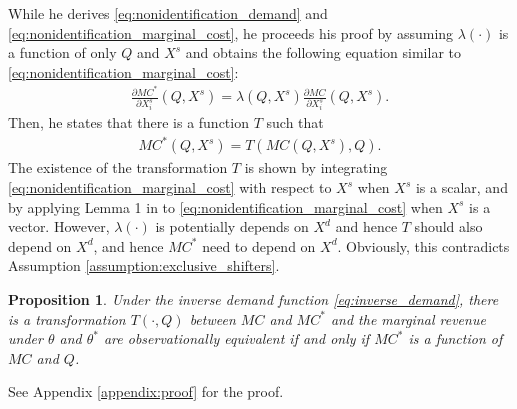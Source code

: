 \documentclass[11pt, a4paper]{article}
\newtheorem{proposition}{Proposition}
\theoremstyle{remark}
\begin{document}
While he derives \eqref{eq:nonidentification_demand} and \eqref{eq:nonidentification_marginal_cost}, he proceeds his proof by assuming $\lambda(\cdot)$ is a function of only $Q$ and $X^{s}$ and obtains the following equation similar to \eqref{eq:nonidentification_marginal_cost}:
\begin{align}
    \frac{\partial MC^{*}}{\partial X^{s}_i}(Q, X^{s}) = \lambda(Q, X^{s}) \frac{\partial MC}{\partial X^{s}_i}(Q, X^{s}). \label{eq:nonidentification_marginal_cost_lau}
\end{align}
Then, he states that there is a function $T$ such that 
\begin{align}
    MC^{*}(Q, X^{s}) = T(MC(Q, X^{s}), Q). \label{eq:mc_transformation_lau}
\end{align}
The existence of the transformation $T$ is shown by integrating \eqref{eq:nonidentification_marginal_cost} with respect to $X^{s}$ when $X^{s}$ is a scalar, and by applying Lemma 1 in \citet{goldmanNote1964} to \eqref{eq:nonidentification_marginal_cost} when $X^{s}$ is a vector.
However, $\lambda(\cdot)$ is potentially depends on $X^{d}$ and hence $T$ should also depend on $X^{d}$, and hence $MC^{*}$ need to depend on $X^{d}$.
Obviously, this contradicts Assumption \ref{assumption:exclusive_shifters}.






\begin{proposition}\label{proposition:sufficient_non-identification}
    Under the inverse demand function \eqref{eq:inverse_demand}, there is a transformation $T(\cdot, Q)$ between $MC$ and $MC^{*}$ and the marginal revenue under $\theta$ and $\theta^{*}$ are observationally equivalent if and only if $MC^{*}$ is a function of $MC$ and $Q$.
\end{proposition}
See Appendix \ref{appendix:proof} for the proof.
\end{document}
